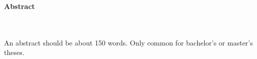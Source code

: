 %
%
%

\thispagestyle{empty}

\begin{adjustwidth}{-2cm}{}







\begin{Huge}\textbf{
\newline
\newline
\newline
\newline
\newline %
Abstract}\end{Huge} \\ \\

An abstract should be about 150 words. Only common for bachelor's or master's theses.





\end{adjustwidth}

